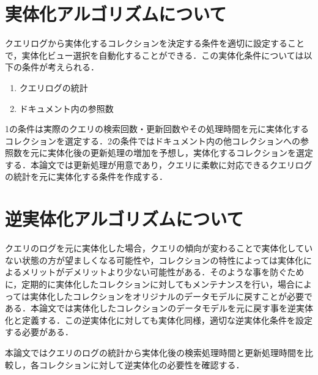 \documentclass[a4paper,11pt]{ujreport}
\begin{document}
\section{実体化アルゴリズムについて}
クエリログから実体化するコレクションを決定する条件を適切に設定することで，実体化ビュー選択を自動化することができる．この実体化条件については以下の条件が考えられる．
\begin{enumerate}
  \item クエリログの統計
  \item ドキュメント内の参照数
\end{enumerate}
1の条件は実際のクエリの検索回数・更新回数やその処理時間を元に実体化するコレクションを選定する．2の条件ではドキュメント内の他コレクションへの参照数を元に実体化後の更新処理の増加を予想し，実体化するコレクションを選定する．本論文では更新処理が用意であり，クエリに柔軟に対応できるクエリログの統計を元に実体化する条件を作成する．

\section{逆実体化アルゴリズムについて}
クエリのログを元に実体化した場合，クエリの傾向が変わることで実体化していない状態の方が望ましくなる可能性や，コレクションの特性によっては実体化によるメリットがデメリットより少ない可能性がある．そのような事を防ぐために，定期的に実体化したコレクションに対してもメンテナンスを行い，場合によっては実体化したコレクションをオリジナルのデータモデルに戻すことが必要である．本論文では実体化したコレクションのデータモデルを元に戻す事を逆実体化と定義する．この逆実体化に対しても実体化同様，適切な逆実体化条件を設定する必要がある．

本論文ではクエリのログの統計から実体化後の検索処理時間と更新処理時間を比較し，各コレクションに対して逆実体化の必要性を確認する．
\end{document}
